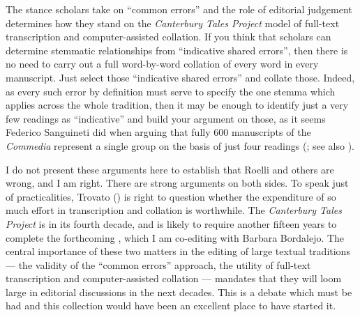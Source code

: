\documentclass{article}
\begin{document}
The stance scholars take on ``common errors'' and the role of
editorial judgement determines how they stand on the \emph{Canterbury
Tales Project} model of full-text transcription and computer-assisted
collation. If you think that scholars can determine stemmatic
relationships from ``indicative shared errors'', then there is no need
to carry out a full word-by-word collation of every word in every
manuscript. Just select those ``indicative shared errors'' and collate
those. Indeed, as every such error by definition must serve to specify
the one stemma which applies across the whole tradition, then it may be
enough to identify just a very few readings as ``indicative'' and build
your argument on those, as it seems Federico Sanguineti did when arguing
that fully 600 manuscripts of the \emph{Commedia} represent a single
group on the basis of just four readings (\cite[8]{robinson_textual_2012}; see also \cite[50--67]{shaw_introduction_2021}).

I do not present these arguments here to establish that Roelli
and others are wrong, and I am right. There are strong arguments on both
sides. To speak just of practicalities, Trovato (\citeyear{trovato_everything_2017}) is right to
question whether the expenditure of so much effort in transcription and
collation is worthwhile. The \emph{Canterbury Tales Project} is in its
fourth decade, and is likely to require another fifteen years to
complete the forthcoming , which I am co-editing with
Barbara Bordalejo. The central importance of these two matters in the
editing of large textual traditions –– the validity of the ``common
errors'' approach, the utility of full-text transcription and
computer-assisted collation –– mandates that they will loom large in
editorial discussions in the next decades. This is a debate which must
be had and this collection would have been an excellent place to have
started it.
\end{document}
